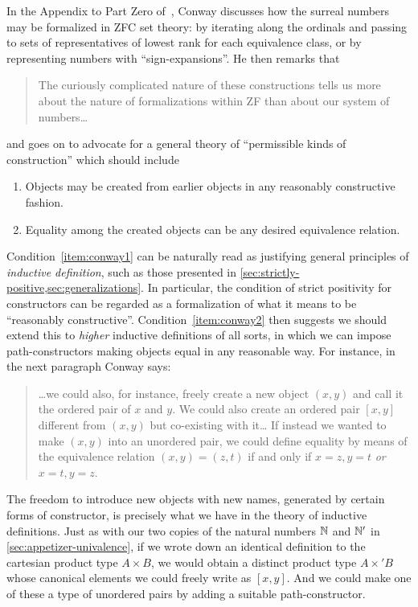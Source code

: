 In the Appendix to Part Zero of~\cite{conway:onag}, Conway discusses how the surreal numbers may be formalized in ZFC set theory: by iterating along the ordinals and passing to sets of representatives of lowest rank for each equivalence class, or by representing numbers with ``sign-expansions''.
He then remarks that
\begin{quote}\footnotesize
  The curiously complicated nature of these constructions tells us more about the nature of formalizations within ZF than about our system of numbers\dots
\end{quote}
and goes on to advocate for a general theory of ``permissible kinds of construction'' which should include
\begin{enumerate}\footnotesize
\item Objects may be created from earlier objects in any reasonably constructive fashion.\label{item:conway1}
\item Equality among the created objects can be any desired equivalence relation.\label{item:conway2}
\end{enumerate}
\noindent
Condition~\ref{item:conway1} can be naturally read as justifying general principles of \emph{inductive definition}, such as those presented in \autoref{sec:strictly-positive,sec:generalizations}.
In particular, the condition of strict positivity for constructors can be regarded as a formalization of what it means to be ``reasonably constructive''.
Condition~\ref{item:conway2} then suggests we should extend this to \emph{higher} inductive definitions of all sorts, in which we can impose path-constructors making objects equal in any reasonable way.
For instance, in the next paragraph Conway says:
\begin{quote}\footnotesize
  \dots we could also, for instance, freely create a new object $(x,y)$ and call it the ordered pair of $x$ and $y$.
  We could also create an ordered pair $[x,y]$ different from $(x,y)$ but co-existing with it\dots
  If instead we wanted to make $(x,y)$ into an unordered pair, we could define equality by means of the equivalence relation $(x,y)=(z,t)$ if and only if $x=z,y=t$ \emph{or} $x=t,y=z$.
\end{quote}
The freedom to introduce new objects with new names, generated by certain forms of constructor, is precisely what we have in the theory of inductive definitions.
Just as with our two copies of the natural numbers $\mathbb{N}$ and $\mathbb{N}'$ in \autoref{sec:appetizer-univalence}, if we wrote down an identical definition to the cartesian product type $A\times B$, we would obtain a distinct product type $A\times' B$ whose canonical elements we could freely write as $[x,y]$.
And we could make one of these a type of unordered pairs by adding a suitable path-constructor. %

